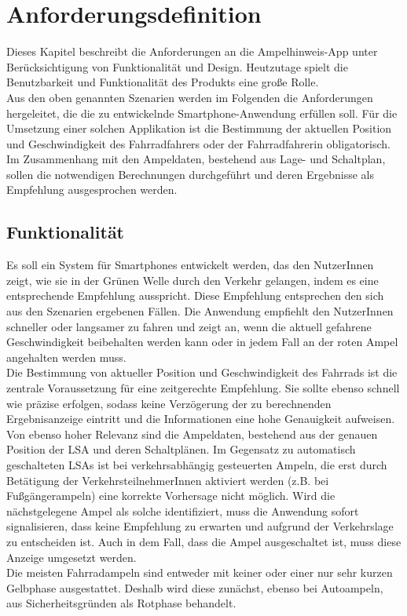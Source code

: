 \chapter{\label{chap:anforderungen}Anforderungsdefinition}
Dieses Kapitel beschreibt die Anforderungen an die Ampelhinweis-\gls{App} unter Berücksichtigung von Funktionalität und Design. Heutzutage spielt die Benutzbarkeit und Funktionalität des Produkts eine große Rolle.\\
Aus den oben genannten Szenarien werden im Folgenden die Anforderungen hergeleitet, die die zu entwickelnde \gls{Smartphone}-Anwendung erfüllen soll. Für die Umsetzung einer solchen Applikation ist die Bestimmung der aktuellen Position und Geschwindigkeit des Fahrradfahrers oder der Fahrradfahrerin obligatorisch. Im Zusammenhang mit den Ampeldaten, bestehend aus Lage- und Schaltplan, sollen die notwendigen Berechnungen durchgeführt und deren Ergebnisse als Empfehlung ausgesprochen werden.
\section{Funktionalität}
Es soll ein System für \glspl{Smartphone} entwickelt werden, das den NutzerInnen zeigt, wie sie in der Grünen Welle durch den Verkehr gelangen, indem es eine entsprechende Empfehlung ausspricht. Diese Empfehlung entsprechen den sich aus den Szenarien ergebenen Fällen. Die Anwendung empfiehlt den NutzerInnen schneller oder langsamer zu fahren und zeigt an, wenn die aktuell gefahrene Geschwindigkeit beibehalten werden kann oder in jedem Fall an der roten Ampel angehalten werden muss.\\ 
Die Bestimmung von aktueller Position und Geschwindigkeit des Fahrrads ist die zentrale Voraussetzung für eine zeitgerechte Empfehlung. Sie sollte ebenso schnell wie präzise erfolgen, sodass keine Verzögerung der zu berechnenden Ergebnisanzeige eintritt und die Informationen eine hohe Genauigkeit aufweisen.\\
Von ebenso hoher Relevanz sind die Ampeldaten, bestehend aus der genauen Position der \gls{LSA} und deren Schaltplänen. Im Gegensatz zu automatisch geschalteten \glspl{LSA} ist bei verkehrsabhängig gesteuerten Ampeln, die erst durch Betätigung der VerkehrsteilnehmerInnen aktiviert werden (z.B. bei Fußgängerampeln) eine korrekte Vorhersage nicht möglich. Wird die nächstgelegene Ampel als solche identifiziert, muss die Anwendung sofort signalisieren, dass keine Empfehlung zu erwarten und aufgrund der Verkehrslage zu entscheiden ist. Auch in dem Fall, dass die Ampel ausgeschaltet ist, muss diese Anzeige umgesetzt werden.\\
Die meisten Fahrradampeln sind entweder mit keiner oder einer nur sehr kurzen Gelbphase ausgestattet. Deshalb wird diese zunächst, ebenso bei Autoampeln, aus Sicherheitsgründen als Rotphase behandelt.
